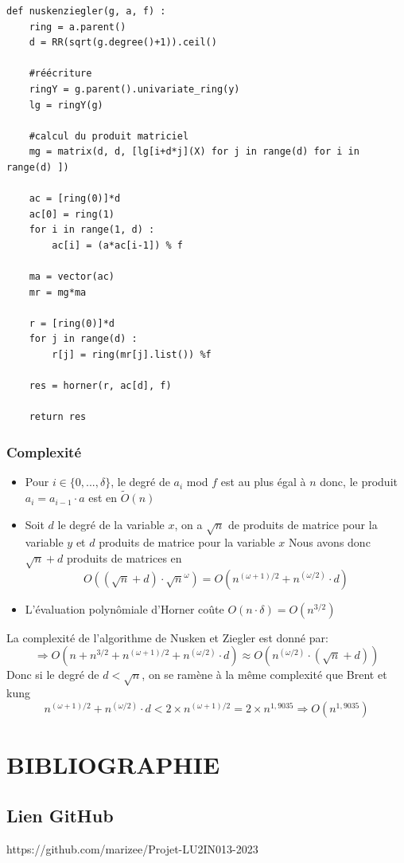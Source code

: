 \documentclass[a4paper]{article}
\begin{document}
\bigskip

\begin{lstlisting}[title={nusken et ziegler}]
def nuskenziegler(g, a, f) :
    ring = a.parent()
    d = RR(sqrt(g.degree()+1)).ceil()

    #réécriture
    ringY = g.parent().univariate_ring(y)
    lg = ringY(g)

    #calcul du produit matriciel
    mg = matrix(d, d, [lg[i+d*j](X) for j in range(d) for i in range(d) ])

    ac = [ring(0)]*d
    ac[0] = ring(1)
    for i in range(1, d) :
        ac[i] = (a*ac[i-1]) % f

    ma = vector(ac)
    mr = mg*ma

    r = [ring(0)]*d
    for j in range(d) :
        r[j] = ring(mr[j].list()) %f
    
    res = horner(r, ac[d], f)

    return res
\end{lstlisting}

\subsubsection*{Complexité}
\begin{itemize}
    \item Pour $i \in \{0,...,\delta\}$, le degré de $a_i$ mod $f$ est au plus égal à $n$ donc, le produit $a_i=a_{i-1}\cdot a$ est en $\tilde{O}(n)$
    \item Soit $d$ le degré de la variable $x$, on a $\sqrt{n}$ de produits de matrice pour la variable $y$ et $d$ produits de matrice pour la variable $x$
    Nous avons donc $\sqrt{n} + d$ produits de matrices en $$O((\sqrt{n}+d)\cdot \sqrt{n}^{\omega})=O(n^{(\omega+1)/2} + n^{(\omega/2)}\cdot d)$$ 
    \item L'évaluation polynômiale d'Horner coûte $O(n\cdot \delta)=O(n^{3/2})$
\end{itemize}
La complexité de l'algorithme de Nusken et Ziegler est donné par:
\[
\Longrightarrow O(n + n^{3/2} + n^{(\omega+1)/2} + n^{(\omega/2)}\cdot d) \approx O(n^{(\omega/2)}\cdot (\sqrt{n}+d))
\]
Donc si le degré de $d<\sqrt{n}$, on se ramène à la même complexité que Brent et kung
\[
n^{(\omega+1)/2} + n^{(\omega/2)}\cdot d < 2\times{n}^{(\omega+1)/2} = 2\times{n}^{1,9035} \Longrightarrow O(n^{1,9035})
\]

\bigskip
\section{BIBLIOGRAPHIE}

\nocite{*}




\subsection*{Lien GitHub} 
https://github.com/marizee/Projet-LU2IN013-2023
\end{document}
